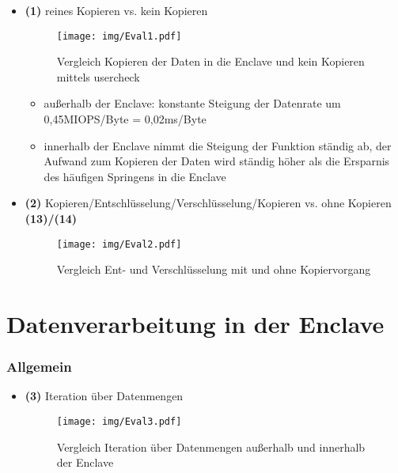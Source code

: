 \begin{itemize}
	\item \textbf{(1)} reines Kopieren vs. kein Kopieren
	\begin{figure}[h]
		\texttt{[image: img/Eval1.pdf]}
		\centering
		\caption{Vergleich Kopieren der Daten in die Enclave und kein Kopieren mittels user\textunderscore check}
		\label{fig:eval1}
	\end{figure}
	
	\begin{itemize}
		\item außerhalb der Enclave: konstante Steigung der Datenrate um 0,45MIOPS/Byte = 0,02ms/Byte
		\item innerhalb der Enclave nimmt die Steigung der Funktion ständig ab, der Aufwand zum Kopieren der Daten wird ständig höher als die Ersparnis des häufigen Springens in die Enclave
	\end{itemize}
	
	\item \textbf{(2)} Kopieren/Entschlüsselung/Verschlüsselung/Kopieren vs. ohne Kopieren \textbf{(13)/(14)} 
	\begin{figure}[h]
		\texttt{[image: img/Eval2.pdf]}
		\centering
		\caption{Vergleich Ent- und Verschlüsselung mit und ohne Kopiervorgang}
		\label{fig:eval2}
	\end{figure}
	
\end{itemize}

\section{Datenverarbeitung in der Enclave}
\subsubsection{Allgemein}

\begin{itemize}
	\item \textbf{(3)} Iteration über Datenmengen 
	\begin{figure}[h]
		\texttt{[image: img/Eval3.pdf]}
		\centering
		\caption{Vergleich Iteration über Datenmengen außerhalb und innerhalb der Enclave}
		\label{fig:eval3}
	\end{figure}
\end{itemize}
